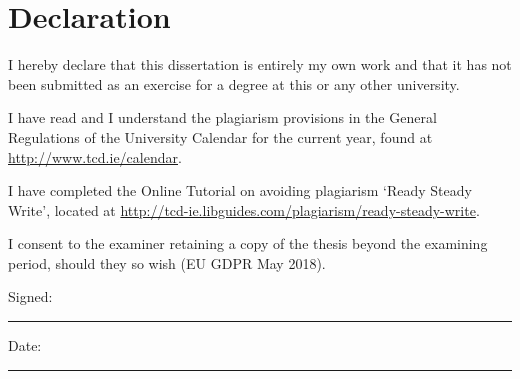 \section*{\Huge{Declaration}}

\vspace{1cm}
I hereby declare that this dissertation is entirely my own work and that it has not been submitted as an exercise for a degree at this or any other university.

\vspace{1cm}
I have read and I understand the plagiarism provisions in the General Regulations of the University Calendar for the current year, found at \url{http://www.tcd.ie/calendar}.

\vspace{1cm}
I have completed the Online Tutorial on avoiding plagiarism `Ready Steady Write', located at \url{http://tcd-ie.libguides.com/plagiarism/ready-steady-write}.

\vspace{1cm}
I consent to the examiner retaining a copy of the thesis beyond the examining period, should they so wish (EU GDPR May 2018).

\vspace{3cm}
Signed:~\rule{5cm}{0.3pt}\hfill Date:~\rule{5cm}{0.3pt}
